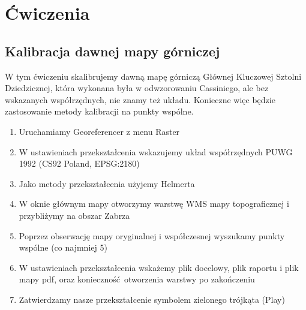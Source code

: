 \documentclass[a4paper,11pt, onecolumn, openany]{memoir}
\begin{document}
		\section{Ćwiczenia}
		\subsection{Kalibracja dawnej mapy górniczej}
		W tym ćwiczeniu skalibrujemy dawną mapę górniczą Głównej Kluczowej Sztolni Dziedzicznej, która wykonana była w odwzorowaniu Cassiniego, ale bez wskazanych współrzędnych, nie znamy też układu. Konieczne więc będzie zastosowanie metody kalibracji na punkty wspólne.

		\begin{enumerate}
		\item Uruchamiamy Georeferencer z menu Raster
		\item W ustawieniach przekształcenia wskazujemy układ współrzędnych PUWG 1992 (CS92 Poland, EPSG:2180)
		\item Jako metody przekształcenia użyjemy Helmerta
		\item W oknie głównym mapy otworzymy warstwę WMS mapy topograficznej i przybliżymy na obszar Zabrza
		\item Poprzez obserwację mapy oryginalnej i współczesnej wyszukamy punkty wspólne (co najmniej 5)
		\item W ustawieniach przekształcenia wskażemy plik docelowy, plik raportu i plik mapy pdf, oraz konieczność otworzenia warstwy po zakończeniu
		\item Zatwierdzamy nasze przekształcenie symbolem zielonego trójkąta (Play)
		\end{enumerate}
\end{document}
